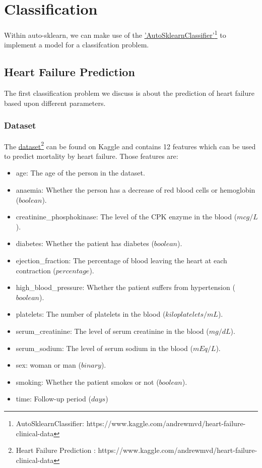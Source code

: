 \chapter{Classification}
\newcommand{\linkAutoSklearnClassifier}{https://www.kaggle.com/andrewmvd/heart-failure-clinical-data}

Within auto-sklearn, we can make use of the \href{\linkAutoSklearnClassifier}{'AutoSklearnClassifier'\footnote{AutoSklearnClassifier: \href{\linkAutoSklearnClassifier}{\linkAutoSklearnClassifier}}} to implement a model for a classifcation problem.

\section{Heart Failure Prediction}
\label{HeartFailurePrediction}

The first classification problem we discuss is about the prediction of heart failure based upon different parameters.

\subsection{Dataset}
\newcommand{\kagglelinkheartfailure}{https://www.kaggle.com/andrewmvd/heart-failure-clinical-data}

The \href{\kagglelinkheartfailure}{dataset\footnote{Heart Failure Prediction : \href{\kagglelinkheartfailure}{\kagglelinkheartfailure}}} can be found on Kaggle and contains 12 features which can be used to predict mortality by heart failure. Those features are:

\begin{itemize}
  \item age: The age of the person in the dataset.
  \item anaemia: Whether the person has a decrease of red blood cells or hemoglobin ($boolean$).
  \item creatinine\_phosphokinase: The level of the CPK enzyme in the blood ($mcg/L$).
  \item diabetes: Whether the patient has diabetes ($boolean$).
  \item ejection\_fraction: The percentage of blood leaving the heart at each contraction ($percentage$).
  \item high\_blood\_pressure: Whether the patient suffers from hypertension ($boolean$).
  \item platelets: The number of platelets in the blood ($kiloplatelets/mL$).
  \item serum\_creatinine: The level of serum creatinine in the blood ($mg/dL$).
  \item serum\_sodium: The level of serum sodium in the blood ($mEq/L$).
  \item sex: woman or man ($binary$).
  \item smoking: Whether the patient smokes or not ($boolean$).
  \item time: Follow-up period ($days$)
\end{itemize}


